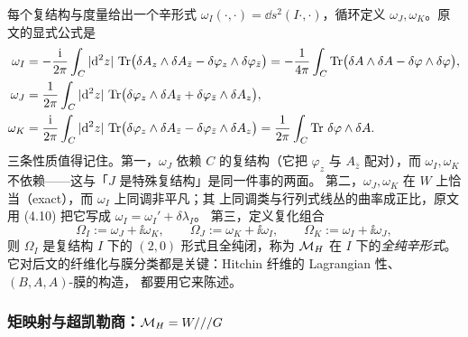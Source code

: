 每个复结构与度量给出一个辛形式 $\omega_I(\cdot,\cdot)=\dd s^2(I\cdot,\cdot)$，循环定义
$\omega_J,\omega_K$。原文的显式公式是\pA{}
\begin{align}
\omega_I&=-\frac{\mathrm{i}}{2\pi}\int_C|\mathrm{d}^2z|\,\operatorname{Tr}\bigl(\delta A_z\wedge\delta A_{\bar z}-\delta\varphi_z\wedge\delta\varphi_{\bar z}\bigr)
=-\frac{1}{4\pi}\int_C\operatorname{Tr}\bigl(\delta A\wedge\delta A-\delta\varphi\wedge\delta\varphi\bigr),\label{eq:omegaI}\\
\omega_J&=\frac{1}{2\pi}\int_C|\mathrm{d}^2z|\,\operatorname{Tr}\bigl(\delta\varphi_z\wedge\delta A_{\bar z}+\delta\varphi_{\bar z}\wedge\delta A_z\bigr),\label{eq:omegaJ}\\
\omega_K&=\frac{\mathrm{i}}{2\pi}\int_C|\mathrm{d}^2z|\,\operatorname{Tr}\bigl(\delta\varphi_z\wedge\delta A_{\bar z}-\delta\varphi_{\bar z}\wedge\delta A_z\bigr)
=\frac{1}{2\pi}\int_C\operatorname{Tr}\,\delta\varphi\wedge\delta A .\label{eq:omegaK}
\end{align}
三条性质值得记住。第一，$\omega_J$ 依赖 $C$ 的复结构（它把 $\varphi_z$ 与 $A_{\bar z}$
配对），而 $\omega_I,\omega_K$ 不依赖——这与「$J$ 是特殊复结构」是同一件事的两面。
第二，$\omega_J,\omega_K$ 在 $W$ 上恰当（exact），而 $\omega_I$ 上同调非平凡；其
上同调类与行列式线丛的曲率成正比，原文用 (4.10) 把它写成 $\omega_I=\omega_I'+\delta\lambda_I$。
第三，定义复化组合
\begin{equation}
\Omega_I:=\omega_J+\ii\omega_K,\qquad
\Omega_J:=\omega_K+\ii\omega_I,\qquad
\Omega_K:=\omega_I+\ii\omega_J ,
\label{eq:Omega}
\end{equation}
则 $\Omega_I$ 是复结构 $I$ 下的 $(2,0)$ 形式且全纯闭，称为 $\mathcal{M}_H$ 在 $I$ 下的\emph{全纯辛形式}。
它对后文的纤维化与膜分类都是关键：Hitchin 纤维的 Lagrangian 性、$(B,A,A)$-膜的构造，
都要用它来陈述。\pA{}

\subsubsection*{矩映射与超凯勒商：$\mathcal{M}_H=W///G$}

